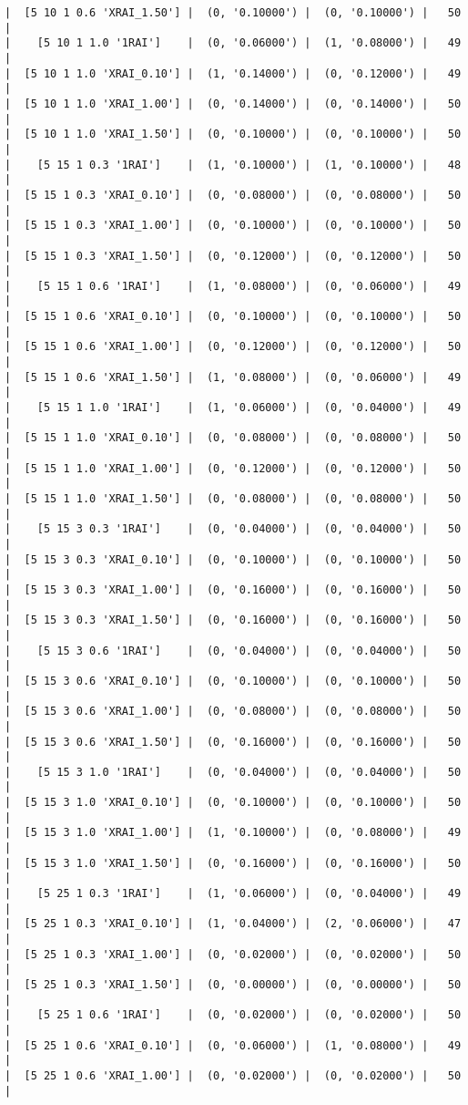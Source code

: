 \documentclass{article}
\begin{document}
\begin{verbatim}
|  [5 10 1 0.6 'XRAI_1.50'] |  (0, '0.10000') |  (0, '0.10000') |   50  |
|    [5 10 1 1.0 '1RAI']    |  (0, '0.06000') |  (1, '0.08000') |   49  |
|  [5 10 1 1.0 'XRAI_0.10'] |  (1, '0.14000') |  (0, '0.12000') |   49  |
|  [5 10 1 1.0 'XRAI_1.00'] |  (0, '0.14000') |  (0, '0.14000') |   50  |
|  [5 10 1 1.0 'XRAI_1.50'] |  (0, '0.10000') |  (0, '0.10000') |   50  |
|    [5 15 1 0.3 '1RAI']    |  (1, '0.10000') |  (1, '0.10000') |   48  |
|  [5 15 1 0.3 'XRAI_0.10'] |  (0, '0.08000') |  (0, '0.08000') |   50  |
|  [5 15 1 0.3 'XRAI_1.00'] |  (0, '0.10000') |  (0, '0.10000') |   50  |
|  [5 15 1 0.3 'XRAI_1.50'] |  (0, '0.12000') |  (0, '0.12000') |   50  |
|    [5 15 1 0.6 '1RAI']    |  (1, '0.08000') |  (0, '0.06000') |   49  |
|  [5 15 1 0.6 'XRAI_0.10'] |  (0, '0.10000') |  (0, '0.10000') |   50  |
|  [5 15 1 0.6 'XRAI_1.00'] |  (0, '0.12000') |  (0, '0.12000') |   50  |
|  [5 15 1 0.6 'XRAI_1.50'] |  (1, '0.08000') |  (0, '0.06000') |   49  |
|    [5 15 1 1.0 '1RAI']    |  (1, '0.06000') |  (0, '0.04000') |   49  |
|  [5 15 1 1.0 'XRAI_0.10'] |  (0, '0.08000') |  (0, '0.08000') |   50  |
|  [5 15 1 1.0 'XRAI_1.00'] |  (0, '0.12000') |  (0, '0.12000') |   50  |
|  [5 15 1 1.0 'XRAI_1.50'] |  (0, '0.08000') |  (0, '0.08000') |   50  |
|    [5 15 3 0.3 '1RAI']    |  (0, '0.04000') |  (0, '0.04000') |   50  |
|  [5 15 3 0.3 'XRAI_0.10'] |  (0, '0.10000') |  (0, '0.10000') |   50  |
|  [5 15 3 0.3 'XRAI_1.00'] |  (0, '0.16000') |  (0, '0.16000') |   50  |
|  [5 15 3 0.3 'XRAI_1.50'] |  (0, '0.16000') |  (0, '0.16000') |   50  |
|    [5 15 3 0.6 '1RAI']    |  (0, '0.04000') |  (0, '0.04000') |   50  |
|  [5 15 3 0.6 'XRAI_0.10'] |  (0, '0.10000') |  (0, '0.10000') |   50  |
|  [5 15 3 0.6 'XRAI_1.00'] |  (0, '0.08000') |  (0, '0.08000') |   50  |
|  [5 15 3 0.6 'XRAI_1.50'] |  (0, '0.16000') |  (0, '0.16000') |   50  |
|    [5 15 3 1.0 '1RAI']    |  (0, '0.04000') |  (0, '0.04000') |   50  |
|  [5 15 3 1.0 'XRAI_0.10'] |  (0, '0.10000') |  (0, '0.10000') |   50  |
|  [5 15 3 1.0 'XRAI_1.00'] |  (1, '0.10000') |  (0, '0.08000') |   49  |
|  [5 15 3 1.0 'XRAI_1.50'] |  (0, '0.16000') |  (0, '0.16000') |   50  |
|    [5 25 1 0.3 '1RAI']    |  (1, '0.06000') |  (0, '0.04000') |   49  |
|  [5 25 1 0.3 'XRAI_0.10'] |  (1, '0.04000') |  (2, '0.06000') |   47  |
|  [5 25 1 0.3 'XRAI_1.00'] |  (0, '0.02000') |  (0, '0.02000') |   50  |
|  [5 25 1 0.3 'XRAI_1.50'] |  (0, '0.00000') |  (0, '0.00000') |   50  |
|    [5 25 1 0.6 '1RAI']    |  (0, '0.02000') |  (0, '0.02000') |   50  |
|  [5 25 1 0.6 'XRAI_0.10'] |  (0, '0.06000') |  (1, '0.08000') |   49  |
|  [5 25 1 0.6 'XRAI_1.00'] |  (0, '0.02000') |  (0, '0.02000') |   50  |

\end{verbatim}
\end{document}
